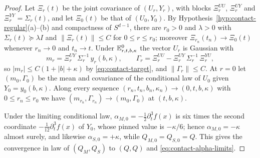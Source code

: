 \begin{proof}
Let $\Xi_r(t)$ be the joint covariance of $(U_r,Y_r)$, with blocks $\Xi^{UU}_r$, $\Xi^{UY}_r$ and $\Xi^{YY}_r=\Sigma_r(t)$, and let $\Xi_0(t)$ be that of $(U_0,Y_0)$. By Hypothesis~\ref{hyp:contact-regular}(a)--(b) and compactness of $S^{d-1}$, there are $r_0>0$ and $\lambda>0$ with $\Sigma_r(t)\succeq\lambda I$ and $\|\Xi_r(t)\|\le C$ for $0\le r\le r_0$; moreover $\Xi_{r_n}(t_n)\to\Xi_0(t)$ whenever $r_n\to0$ and $t_n\to t$. Under $\mathbb E^0_{r,t,b,\kappa}$ the vector $U_r$ is Gaussian with
\[
m_r=\Xi^{UY}_r\,\Sigma_r^{-1}\,y_r(b,\kappa),\qquad\Gamma_r=\Xi^{UU}_r-\Xi^{UY}_r\,\Sigma_r^{-1}\,\Xi^{YU}_r ,
\]
so $|m_r|\le C(1+|b|+\kappa)$ by \eqref{eq:contact-target}, and $\|\Gamma_r\|\le C$. At $r=0$ let $(m_0,\Gamma_0)$ be the mean and covariance of the conditional law of $U_0$ given $Y_0=y_0(b,\kappa)$. Along every sequence $(r_n,t_n,b_n,\kappa_n)\to(0,t,b,\kappa)$ with $0\le r_n\le r_0$ we have $(m_{r_n},\Gamma_{r_n})\to(m_0,\Gamma_0)$ at $(t,b,\kappa)$.

Under the limiting conditional law, $\alpha_{M,0}=-\frac12\partial_t^3f(x)$ is six times the second coordinate $-\frac1{12}\partial_t^3f(x)$ of $Y_0$, whose pinned value is $-\kappa/6$; hence $\alpha_{M,0}=-\kappa$ almost surely, and likewise $\alpha_{S,0}=+\kappa$, while $Q_{M,0}=Q_{S,0}=Q$. This gives the convergence in law of $(Q_M,Q_S)$ to $(Q,Q)$ and \eqref{eq:contact-alpha-limits}.


\end{proof}
